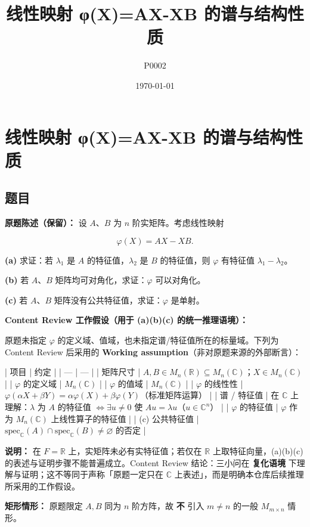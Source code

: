 \documentclass[
    lang=cn,
    color=blue,
    mode=fancy,
    thmcnt=section,
    scheme=chinese
]{elegantbook}
\title{线性映射 φ(X)=AX-XB 的谱与结构性质}
\subtitle{P0002}
\author{}
\institute{}
\date{\today}
\begin{document}
\maketitle
\mainmatter

\chapter{线性映射 φ(X)=AX-XB 的谱与结构性质}

\section{题目}
\textbf{原题陈述（保留）：} 设 $A$、$B$ 为 $n$ 阶实矩阵。考虑线性映射

\[
\varphi(X)=AX-XB.
\]

\textbf{(a)} 求证：若 $\lambda_1$ 是 $A$ 的特征值，$\lambda_2$ 是 $B$ 的特征值，则 $\varphi$ 有特征值 $\lambda_1 - \lambda_2$。

\textbf{(b)} 若 $A$、$B$ 矩阵均可对角化，求证：$\varphi$ 可以对角化。

\textbf{(c)} 若 $A$、$B$ 矩阵没有公共特征值，求证：$\varphi$ 是单射。

\par
\textbf{Content Review 工作假设（用于 (a)(b)(c) 的统一推理语境）：}

原题未指定 $\varphi$ 的定义域、值域，也未指定谱/特征值所在的标量域。下列为 Content Review 后采用的 \textbf{Working assumption}（非对原题来源的外部断言）：

| 项目 | 约定 |
| --- | --- |
| 矩阵尺寸 | $A,B\in M_n(\mathbb{R})\subseteq M_n(\mathbb{C})$；$X\in M_n(\mathbb{C})$ |
| $\varphi$ 的定义域 | $M_n(\mathbb{C})$ |
| $\varphi$ 的值域 | $M_n(\mathbb{C})$ |
| $\varphi$ 的线性性 | $\varphi(\alpha X+\beta Y)=\alpha\varphi(X)+\beta\varphi(Y)$（标准矩阵运算） |
| 谱 / 特征值 | 在 $\mathbb{C}$ 上理解：$\lambda$ 为 $A$ 的特征值 $\Leftrightarrow\exists u\neq 0$ 使 $Au=\lambda u$（$u\in\mathbb{C}^n$） |
| $\varphi$ 的特征值 | $\varphi$ 作为 $M_n(\mathbb{C})$ 上线性算子的特征值 |
| (c) 公共特征值 | $\mathrm{spec}_{\mathbb{C}}(A)\cap\mathrm{spec}_{\mathbb{C}}(B)\neq\varnothing$ 的否定 |

\textbf{说明：} 在 $F=\mathbb{R}$ 上，实矩阵未必有实特征值；若仅在 $\mathbb{R}$ 上取特征向量，(a)(b)(c) 的表述与证明步骤不能普遍成立。Content Review 结论：三小问在 \textbf{复化语境} 下理解与证明；这不等同于声称「原题一定只在 $\mathbb{C}$ 上表述」，而是明确本仓库后续推理所采用的工作假设。

\textbf{矩形情形：} 原题限定 $A,B$ 同为 $n$ 阶方阵，故 \textbf{不} 引入 $m\neq n$ 的一般 $M_{m\times n}$ 情形。
\end{document}
